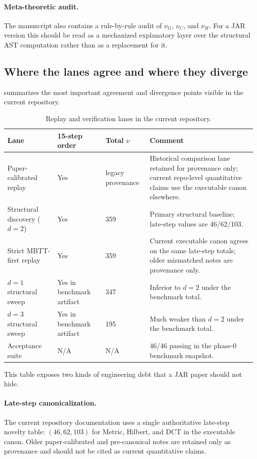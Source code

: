 \documentclass[11pt,a4paper]{article}
\begin{document}
\paragraph{Meta-theoretic audit.}
The manuscript also contains a rule-by-rule audit of $\nu_G$, $\nu_C$, and $\nu_H$. For a JAR version this should be read as a mechanized explanatory layer over the structural AST computation rather than as a replacement for it.

\subsection{Where the lanes agree and where they diverge}

 summarizes the most important agreement and divergence points visible in the current repository.

\begin{table}[H]
\centering
\caption{Replay and verification lanes in the current repository.}
\label{tab:lane-comparison}
\small
\begin{tabular}{@{}p{3.2cm}p{2.1cm}p{1.5cm}p{7.0cm}@{}}
\toprule
Lane & 15-step order & Total $\nu$ & Comment \\
\midrule
Paper-calibrated replay & Yes & legacy provenance & Historical comparison lane retained for provenance only; current repo-level quantitative claims use the executable canon elsewhere. \\
Structural discovery ($d=2$) & Yes & 359 & Primary structural baseline; late-step values are 46/62/103. \\
Strict MBTT-first replay & Yes & 359 & Current executable canon agrees on the same late-step totals; older mismatched notes are provenance only. \\
$d=1$ structural sweep & Yes in benchmark artifact & 347 & Inferior to $d=2$ under the benchmark total. \\
$d=3$ structural sweep & Yes in benchmark artifact & 195 & Much weaker than $d=2$ under the benchmark total. \\
Acceptance suite & N/A & N/A & 46/46 passing in the phase-0 benchmark snapshot. \\
\bottomrule
\end{tabular}
\end{table}

This table exposes two kinds of engineering debt that a JAR paper should not hide.

\paragraph{Late-step canonicalization.}
The current repository documentation uses a single authoritative late-step novelty table: $(46,62,103)$ for Metric, Hilbert, and DCT in the executable canon. Older paper-calibrated and pre-canonical notes are retained only as provenance and should not be cited as current quantitative claims.
\end{document}
